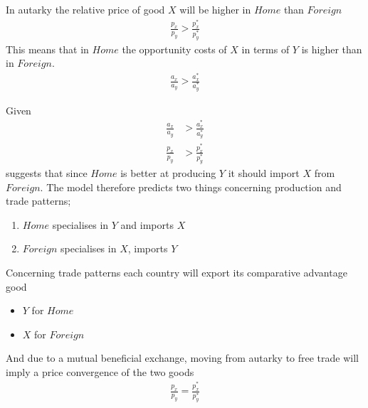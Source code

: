 \documentclass{beamer}
\begin{document}
\begin{frame}
  In autarky the relative price of good $X$ will be higher in $Home$ than $Foreign$ 
  \begin{align*}
    \frac{p_x}{p_y}>\frac{p_x^*}{p_y^*}
  \end{align*}
  \medskip
  This means that in $Home$ the opportunity costs of $X$ in terms of $Y$ is higher than in $Foreign$.
  \begin{align*}
    \frac{a_x}{a_y}>\frac{a_x^*}{a_y^*}
  \end{align*}
  
\end{frame}

\begin{frame}
  Given  
  \begin{align*}
    \frac{a_x}{a_y} &>\frac{a_x^*}{a_y^*}\\
    \frac{p_x}{p_y} &>\frac{p_x^*}{p_y^*}
  \end{align*}
  suggests that since $Home$ is better at producing $Y$ it should import $X$ from $Foreign$.
  The model therefore predicts two things concerning production and trade patterns;  
  \begin{enumerate}
    \item $Home$ specialises in $Y$ and imports $X$
    \item $Foreign$ specialises in $X$, imports $Y$
  \end{enumerate}  
\end{frame}

\begin{frame}
  Concerning trade patterns each country will export its comparative advantage good
  \begin{itemize}
    \item $Y$ for $Home$ 
    \item $X$ for $Foreign$
  \end{itemize}
  \medskip
  And due to a mutual beneficial exchange, moving from autarky to free trade will imply a price convergence of the two goods
  \begin{align*}
    \frac{p_x}{p_y}=\frac{p_x^*}{p_y^*}
  \end{align*}
\end{frame}
\end{document}
